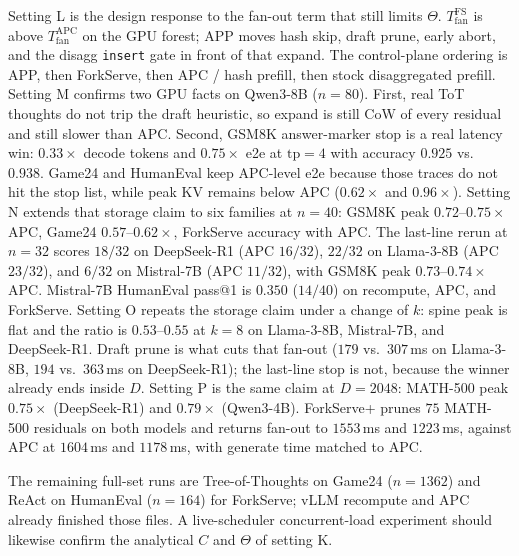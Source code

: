 \documentclass[11pt,a4paper]{article}
\begin{document}
Setting L is the design response to the fan-out term that still limits $\Theta$.
$T_{\mathrm{fan}}^{\mathrm{FS}}$ is above $T_{\mathrm{fan}}^{\mathrm{APC}}$ on the GPU forest; APP moves hash skip, draft prune, early abort, and the disagg \texttt{insert} gate in front of that expand.
The control-plane ordering is APP, then ForkServe, then APC / hash prefill, then stock disaggregated prefill.
Setting M confirms two GPU facts on Qwen3-8B ($n{=}80$).
First, real ToT thoughts do not trip the draft heuristic, so expand is still CoW of every residual and still slower than APC.
Second, GSM8K answer-marker stop is a real latency win: $0.33\times$ decode tokens and $0.75\times$ e2e at $\mathrm{tp}{=}4$ with accuracy $0.925$ vs.\ $0.938$.
Game24 and HumanEval keep APC-level e2e because those traces do not hit the stop list, while peak KV remains below APC ($0.62\times$ and $0.96\times$).
Setting N extends that storage claim to six families at $n{=}40$: GSM8K peak $0.72$--$0.75\times$ APC, Game24 $0.57$--$0.62\times$, ForkServe accuracy with APC.
The last-line rerun at $n{=}32$ scores $18/32$ on DeepSeek-R1 (APC $16/32$), $22/32$ on Llama-3-8B (APC $23/32$), and $6/32$ on Mistral-7B (APC $11/32$), with GSM8K peak $0.73$--$0.74\times$ APC.
Mistral-7B HumanEval pass@1 is $0.350$ ($14/40$) on recompute, APC, and ForkServe.
Setting O repeats the storage claim under a change of $k$: spine peak is flat and the ratio is $0.53$--$0.55$ at $k{=}8$ on Llama-3-8B, Mistral-7B, and DeepSeek-R1.
Draft prune is what cuts that fan-out ($179$ vs.\ $307$\,ms on Llama-3-8B, $194$ vs.\ $363$\,ms on DeepSeek-R1); the last-line stop is not, because the winner already ends inside $D$.
Setting P is the same claim at $D{=}2048$: MATH-500 peak $0.75\times$ (DeepSeek-R1) and $0.79\times$ (Qwen3-4B).
ForkServe+ prunes $75$ MATH-500 residuals on both models and returns fan-out to $1553$\,ms and $1223$\,ms, against APC at $1604$\,ms and $1178$\,ms, with generate time matched to APC.

The remaining full-set runs are Tree-of-Thoughts on Game24 ($n{=}1362$) and ReAct on HumanEval ($n{=}164$) for ForkServe; vLLM recompute and APC already finished those files.
A live-scheduler concurrent-load experiment should likewise confirm the analytical $C$ and $\Theta$ of setting K.
\end{document}
